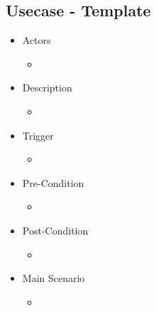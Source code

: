 \documentclass[a4paper,11pt]{article}
\begin{document}
\subsection*{Usecase - Template}
\begin{itemize}
	\item Actors
		\begin{itemize}
			\item
		\end{itemize}
	\item Description
		\begin{itemize}
			\item
		\end{itemize}
	\item Trigger
		\begin{itemize}
			\item
		\end{itemize}
	\item Pre-Condition
		\begin{itemize}
			\item
		\end{itemize}
	\item Post-Condition
		\begin{itemize}
			\item
		\end{itemize}
	\item Main Scenario
		\begin{itemize}
			\item
		\end{itemize}
\end{itemize}
\end{document}
